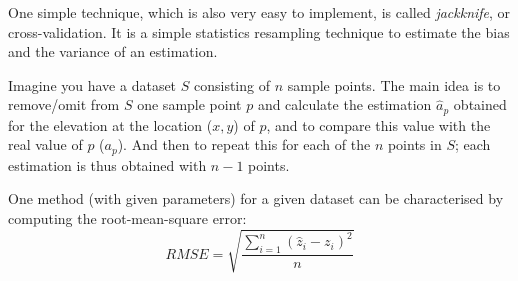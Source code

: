 One simple technique, which is also very easy to implement, is called \emph{jackknife}, or  cross-validation.
It is a simple statistics resampling technique to estimate the bias and the variance of an estimation.

Imagine you have a dataset $S$ consisting of $n$ sample points.
The main idea is to remove/omit from $S$ one sample point $p$ and calculate the estimation $\hat{a}_p$  obtained for the elevation at the location ($x,y$) of $p$, and to compare this value with the real value of $p$ ($a_p$).
And then to repeat this for each of the $n$ points in $S$; each estimation is thus obtained with $n-1$ points.

One method (with given parameters) for a given dataset can be characterised by computing the root-mean-square error:
\begin{equation}
  RMSE = \sqrt{\frac{\sum_{i=1}^{n}(\hat{z}_i - z_i)^2}{n}}
\end{equation}

